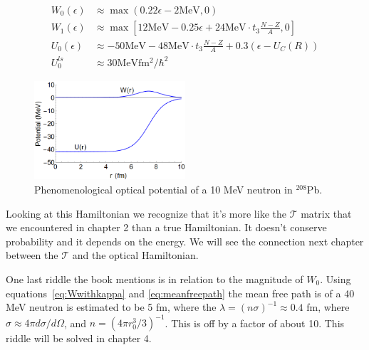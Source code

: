 \documentclass[12pt]{extarticle}
\begin{document}
\begin{align}
   W_0(\epsilon) &\approx \max (0.22\epsilon - 2\mathrm{MeV},0) \\
   W_1(\epsilon) &\approx \max \left[12\mathrm{MeV} - 0.25\epsilon + 24\mathrm{MeV} \cdot t_3\frac{N-Z}{A},0\right] \\
   U_0(\epsilon) &\approx -50\mathrm{MeV}-48\mathrm{MeV}\cdot t_3\frac{N-Z}{A}+0.3(\epsilon-U_C(R)) \\
   U_0^{ls} &\approx 30\mathrm{MeV fm^2/\hbar^2}
\end{align}
\begin{figure}[h]
   \centering
   \includegraphics[width=0.5\textwidth]{fig3_3.png}
   \caption{Phenomenological optical potential of a 10 MeV neutron in ${}^{208}$Pb.}
   \label{fig:phenpot}
\end{figure}

Looking at this Hamiltonian we recognize that it's more like the $\mathcal{T}$ matrix that we encountered in chapter 2 than a true Hamiltonian. It doesn't conserve probability and it depends on the energy. We will see the connection next chapter between the $\mathcal{T}$ and the optical Hamiltonian.

One last riddle the book mentions is in relation to the magnitude of $W_0$. Using equations~\ref{eq:Wwithkappa} and \ref{eq:meanfreepath} the mean free path is of a 40 MeV neutron is estimated to be 5 fm, where the $\lambda = (n\sigma)^{-1} \approx 0.4$ fm, where $\sigma \approx 4\pi d\sigma/d\Omega$, and $n=(4\pi r_0^3/3)^{-1}$. This is off by a factor of about 10. This riddle will be solved in chapter 4.
\end{document}
